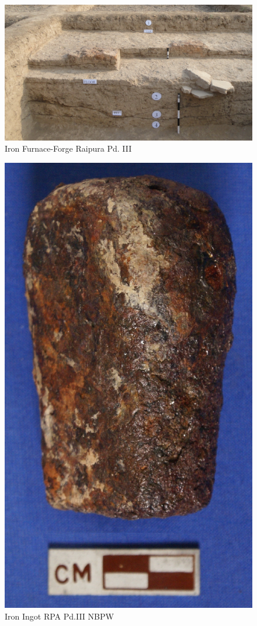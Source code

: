 \begin{figure}[H]
\includegraphics[scale=0.4]{images/chapter-4/fig009.jpg}
\caption{Iron Furnace-Forge Raipura Pd. III}\label{chapter-4-fig9}
\end{figure}
\begin{figure}[H]
\includegraphics[scale=0.4]{images/chapter-4/fig010.jpg}
\caption{Iron Ingot RPA Pd.III NBPW}\label{chapter-4-fig10}
\end{figure}

